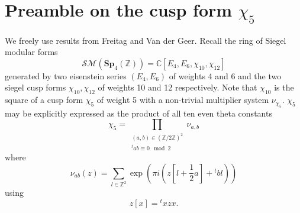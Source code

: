 \documentclass[9pt]{amsart} \usepackage[utf8]{inputenc}
\newcommand{\Z}{\mathbb{Z}} \newcommand{\C}{\mathbb{C}}
\newcommand{\Sp}{\mathbf{Sp}}
\begin{document}


%
%

\tableofcontents

\section{Preamble on the cusp form $\chi_5$}

We freely use results from Freitag\cite{FREITAG:1} and Van der
Geer\cite{VDGEER:1}. Recall the ring of Siegel modular
forms $$\mathcal{SM}(\Sp_4(\Z)) = \C[E_4,E_6,\chi_{10},\chi_{12}]$$
generated by two eisenstein series $(E_4,E_6)$ of weights 4 and 6 and
the two siegel cusp forms $\chi_{10},\chi_{12}$ of weights 10 and 12
respectively. Note that $\chi_{10}$ is the square of a cusp form
$\chi_5$ of weight 5 with a non-trivial multiplier system $\nu_{\chi_5}$.
$\chi_5$ may be explicitly expressed as the product of all ten even theta
constants $$\chi_5 = \displaystyle\prod_{\substack{(a,b)\in (\Z/2\Z)^2\\{}^t ab
\equiv 0 \mod 2}}\nu_{a,b}$$
where $$\nu_{ab}(z) =\displaystyle\sum_{l\in\Z^2} \exp(\pi i (z[l +
\frac{1}{2}a] + {}^tbl))$$ using $$z[x] = {}^tx z x.$$
\end{document}
